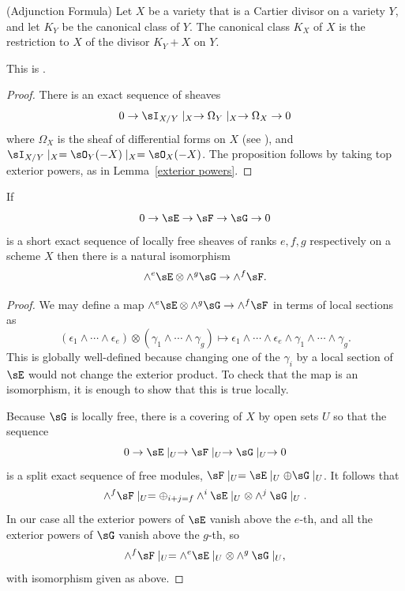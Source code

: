 \begin{proposition}\label{adjunction}(Adjunction Formula)
 Let $X$ be a variety that is a Cartier divisor on a variety $Y$, and let $K_{Y}$ be the canonical class of $Y$. The canonical class $K_X$ of $X$ is
 the restriction to $X$ of the divisor $K_{Y}+X$ on $Y$.
\end{proposition}
This is \cite[Proposition 8.20]{Hartshorne1977}.
\begin{proof}
 There is an exact sequence of sheaves
 $$
0\to  \sI_{X/Y}\mid_{X} \to \Omega_{Y}\mid _{X} \to \Omega_{X} \to 0
 $$
 where $\Omega_{X}$ is the sheaf of differential forms on $X$ (see \cite[Proposition 16.3]{Eisenbud95}), and
$ \sI_{X/Y}\mid_{X} = \sO_{Y}(-X)\mid_{X} = \sO_{X}(-X)$. The proposition follows by taking top exterior powers, 
as in Lemma~\ref{exterior powers}.\end{proof}

\begin{lemma}\label{exterior powers}
 If 
$$
0\to \sE \to \sF\to \sG \to 0
$$
is a short exact sequence of locally free sheaves of ranks $e,f,g$ respectively on a scheme $X$ then there is a natural
isomorphism 
$$
\wedge^e\sE \otimes \wedge^g \sG \to \wedge^f\sF.
$$
\end{lemma}

\begin{proof}
 We may define a map
$
\wedge^e\sE \otimes \wedge^g \sG \to \wedge^f\sF
$
in terms of local sections as
$$
(\epsilon_1\wedge\cdots \wedge \epsilon_e) \otimes (\gamma_1\wedge\cdots\wedge \gamma_g)
\mapsto \epsilon_1\wedge\cdots \wedge \epsilon_e\wedge\gamma_1\wedge\cdots\wedge \gamma_g.
$$
This is globally well-defined because changing one of the $\gamma_i$ by a local section of $\sE$ would not
change the exterior product.
To check that the map is an isomorphism, it is enough to show that this is true locally.

Because $\sG$ is locally free, there is a covering of $X$ by open sets $U$
so that the sequence
$$
0\to \sE\mid_U \to \sF\mid_U\to \sG\mid_U \to 0
$$
is a split exact sequence of free modules, $\sF\mid_U = \sE\mid_U\oplus \sG\mid_U$.
It follows that
$$
\wedge^f\sF\mid_U = \oplus_{i+j = f} \wedge^i \sE\mid_U \otimes \wedge^j\sG\mid_U.
$$
In our case all the exterior powers of $\sE$ vanish above the $e$-th, and all the 
exterior powers of $\sG$ vanish above the $g$-th, so 
$$
\wedge^f\sF\mid_U =  \wedge^e \sE\mid_U \otimes \wedge^g\sG\mid_U,
$$
with isomorphism given as above.
\end{proof}



